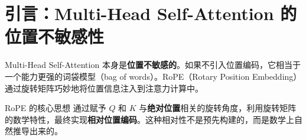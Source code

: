 \section{引言：Multi-Head Self-Attention 的位置不敏感性}

Multi-Head Self-Attention 本身是\textbf{位置不敏感的}。如果不引入位置编码，它相当于一个能力更强的词袋模型（bag of words）。RoPE（Rotary Position Embedding）通过旋转矩阵巧妙地将位置信息注入到注意力计算中。

\begin{importantbox}{RoPE 的核心思想}
通过赋予 $Q$ 和 $K$ 与\textbf{绝对位置}相关的旋转角度，利用旋转矩阵的数学特性，最终实现\textbf{相对位置编码}。这种相对性不是预先构建的，而是数学上自然推导出来的。
\end{importantbox}

